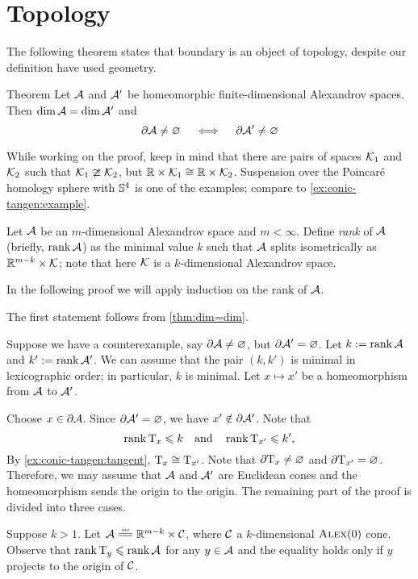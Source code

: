 \section{Topology}

The following theorem states that boundary is an object of topology, despite our definition have used geometry.

\begin{thm}{Theorem}\label{thm:top-bry}
Let $\mathcal{A}$ and $\mathcal{A}'$ be homeomorphic finite-dimensional Alexandrov spaces.
Then $\operatorname{\rm dim}\nolimits \mathcal{A}=\operatorname{\rm dim}\nolimits\mathcal{A}'$ and
\[\partial\mathcal{A}\ne \varnothing
\quad\iff\quad
\partial\mathcal{A}'\ne \varnothing
\]
\end{thm}

While working on the proof, keep in mind that there are pairs of spaces $\mathcal{K}_1$ and $\mathcal{K}_2$ such that $\mathcal{K}_1\ncong \mathcal{K}_2$, but $\mathbb{R}\times \mathcal{K}_1\cong \mathbb{R}\times \mathcal{K}_2$.
Suspension over the Poincaré homology sphere with $\mathbb{S}^4$ is one of the examples; compare to \ref{ex:conic-tangen:example}.

Let $\mathcal{A}$ be an $m$-dimensional Alexandrov space and $m<\infty$.
Define \emph{rank} of $\mathcal{A}$ (briefly, $\operatorname{\rm rank}\nolimits\mathcal{A}$) as the minimal value $k$ such that $\mathcal{A}$ splits isometrically as $\mathbb{R}^{m-k}\times \mathcal{K}$;
note that here $\mathcal{K}$ is a $k$-dimensional Alexandrov space.

In the following proof we will apply induction on the rank of $\mathcal{A}$.


The first statement follows from \ref{thm:dim=dim}.

Suppose we have a counterexample, say $\partial \mathcal{A}\ne \varnothing$, but $\partial \mathcal{A}'=\varnothing$.
Let $k\mathrel{:=}\operatorname{\rm rank}\nolimits \mathcal{A}$ and $k'\mathrel{:=}\operatorname{\rm rank}\nolimits \mathcal{A}'$.
We can assume that the pair $(k,k')$ is minimal in lexicographic order;
in particular, $k$ is minimal.
Let $x\mapsto x'$ be a homeomorphism from $\mathcal{A}$ to $\mathcal{A}'$.

Choose $x\in \partial \mathcal{A}$.
Since $\partial \mathcal{A}'=\varnothing$, we have $x'\notin \partial \mathcal{A}'$.
Note that 
\[\operatorname{\rm rank}\nolimits \mathrm{T}_x\leqslant k
\quad\text{and}\quad
\operatorname{\rm rank}\nolimits \mathrm{T}_{x'}\leqslant k',
\]
By \ref{ex:conic-tangen:tangent}, $\mathrm{T}_x\cong\mathrm{T}_{x'}$.
Note that $\partial \mathrm{T}_x\ne\varnothing$ and $\partial \mathrm{T}_{x'}=\varnothing$.
Therefore, we may assume that $\mathcal{A}$ and $\mathcal{A}'$ are Euclidean cones
and the homeomorphism sends the origin to the origin.
The remaining part of the proof is divided into three cases.

Suppose $k>1$.
Let $\spc{A}\iso \RR^{m-k}\times \spc{C}$, where $\mathcal{C}$ a $k$-dimensional $\textsc{Alex}(0)$ cone.
Observe that $\operatorname{\rm rank}\nolimits\mathrm{T}_y\leqslant\operatorname{\rm rank}\nolimits\mathcal{A}$ for any $y\in\mathcal{A}$ and the equality holds only if $y$ projects to the origin of $\mathcal{C}$.

